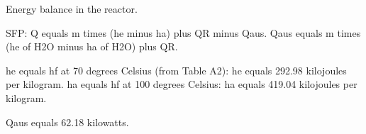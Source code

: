 Energy balance in the reactor.  

SFP: Q equals m times (he minus ha) plus QR minus Qaus.  
Qaus equals m times (he of H2O minus ha of H2O) plus QR.  

he equals hf at 70 degrees Celsius (from Table A2):  
he equals 292.98 kilojoules per kilogram.  
ha equals hf at 100 degrees Celsius:  
ha equals 419.04 kilojoules per kilogram.  

Qaus equals 62.18 kilowatts.